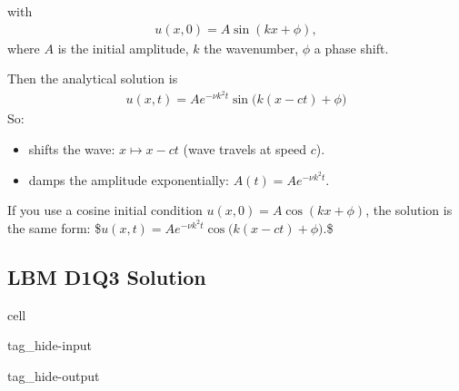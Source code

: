 \documentclass[letterpaper,10pt,english,openany,oneside]{jupyterBook}
\begin{document}
\sphinxAtStartPar
with 
\begin{equation*}
\begin{split}
u(x,0)=A\sin(kx+\phi),
\end{split}
\end{equation*}
\sphinxAtStartPar
where \(A\) is the initial amplitude, \(k\) the wavenumber, \(\phi\) a phase shift.

\sphinxAtStartPar
Then the analytical solution is
\begin{equation*}
\begin{split}
\boxed{u(x,t)=Ae^{-\nu k^{2}t}\sin\big(k(x-ct)+\phi\big) }
\end{split}
\end{equation*}
\sphinxAtStartPar
So:
\begin{itemize}
\item {} 
\sphinxAtStartPar
{} shifts the wave: \(x \mapsto x-ct\) (wave travels at speed \(c\)).

\item {} 
\sphinxAtStartPar
{} damps the amplitude exponentially: \(A(t)=Ae^{-\nu k^{2}t}\).

\end{itemize}

\sphinxAtStartPar
If you use a cosine initial condition \(u(x,0)=A\cos(kx+\phi)\), the solution is the same form:
\$\(
u(x,t)=Ae^{-\nu k^{2}t}\cos\big(k(x-ct)+\phi\big).
\)\$


\subsection{LBM D1Q3 Solution}
\label{\detokenize{LBM-Study/Convective-Diffusive-Equation:lbm-d1q3-solution}}
\begin{sphinxuseclass}{cell}
\begin{sphinxuseclass}{tag_hide-input}
\begin{sphinxuseclass}{tag_hide-output}
\end{sphinxuseclass}
\end{sphinxuseclass}
\end{sphinxuseclass}
\end{document}
